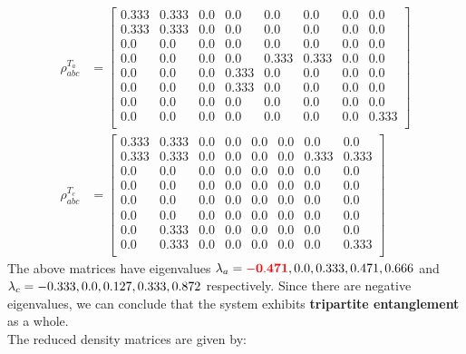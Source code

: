 \documentclass{scrartcl}
\begin{document}
    \begin{align*}
        \rho^{T_a}_{abc} &=
        \left[
        \begin{array}{cccccccc}
        0.333 & 0.333 & 0.0 & 0.0 & 0.0 & 0.0 & 0.0 & 0.0 \\
        0.333 & 0.333 & 0.0 & 0.0 & 0.0 & 0.0 & 0.0 & 0.0 \\
        0.0 & 0.0 & 0.0 & 0.0 & 0.0 & 0.0 & 0.0 & 0.0 \\
        0.0 & 0.0 & 0.0 & 0.0 & 0.333 & 0.333 & 0.0 & 0.0 \\
        0.0 & 0.0 & 0.0 & 0.333 & 0.0 & 0.0 & 0.0 & 0.0 \\
        0.0 & 0.0 & 0.0 & 0.333 & 0.0 & 0.0 & 0.0 & 0.0 \\
        0.0 & 0.0 & 0.0 & 0.0 & 0.0 & 0.0 & 0.0 & 0.0 \\
        0.0 & 0.0 & 0.0 & 0.0 & 0.0 & 0.0 & 0.0 & 0.333 \\
        \end{array}
        \right]\\
            \rho^{T_c}_{abc} &=
            \left[
            \begin{array}{cccccccc}
            0.333 & 0.333 & 0.0 & 0.0 & 0.0 & 0.0 & 0.0 & 0.0 \\
            0.333 & 0.333 & 0.0 & 0.0 & 0.0 & 0.0 & 0.333 & 0.333 \\
            0.0 & 0.0 & 0.0 & 0.0 & 0.0 & 0.0 & 0.0 & 0.0 \\
            0.0 & 0.0 & 0.0 & 0.0 & 0.0 & 0.0 & 0.0 & 0.0 \\
            0.0 & 0.0 & 0.0 & 0.0 & 0.0 & 0.0 & 0.0 & 0.0 \\
            0.0 & 0.0 & 0.0 & 0.0 & 0.0 & 0.0 & 0.0 & 0.0 \\
            0.0 & 0.333 & 0.0 & 0.0 & 0.0 & 0.0 & 0.0 & 0.0 \\
            0.0 & 0.333 & 0.0 & 0.0 & 0.0 & 0.0 & 0.0 & 0.333 \\
            \end{array}
            \right]
            \end{align*}
            The above matrices have eigenvalues $\lambda_a =\mathbf{\mathcolor{red}{-0.471}}, 0.0, 0.333, 0.471, 0.666$ and $\lambda_c=-0.333, 0.0, 0.127, \\0.333, 0.872 $ respectively. Since there are negative eigenvalues, we can conclude that the system exhibits \textbf{tripartite entanglement} as a whole.\\[0.3cm]
            The reduced density matrices are given by:
\end{document}
